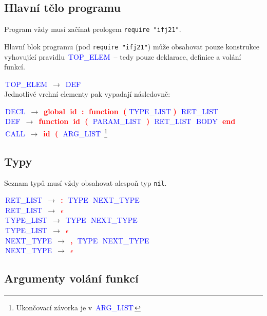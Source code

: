\documentclass[a4paper]{article}
\theoremstyle{definition}
\newcommand{\nter}[1]{\textcolor{blue}{\,#1\,}}
\newcommand{\ter}[1]{\textbf{\textcolor{red}{\,#1\,}}}
\newcommand{\grule}[2]{{\small\nter{#1} $\to$ #2}\\}
\begin{document}
	\begin{multicols}{2}

	\subsection{Hlavní tělo programu}

	Program vždy musí začínat prologem \texttt{require "ifj21"}.


		Hlavní blok programu (pod \texttt{require "ifj21"}) může obsahovat pouze konstrukce vyhovující pravidlu \nter{TOP\_ELEM} -- tedy pouze deklarace, definice a volání funkcí.


	\grule{TOP\_ELEM}{\nter{DEF}}

	Jednotlivé vrchní elementy pak vypadají následovně:

	\grule{DECL}{\ter{global} \ter{id} \ter{:} \ter{function} \ter{(}\nter{TYPE\_LIST}\ter{)} \nter{RET\_LIST}}
	\grule{DEF}{\ter{function} \ter{id} \ter{(} \nter{PARAM\_LIST} \ter{)} \nter{RET\_LIST} \nter{BODY} \ter{end}}
	\grule{CALL}{\ter{id} \ter{(} \nter{ARG\_LIST} \footnote{Ukončovací závorka je v \nter{ARG\_LIST}}} %


	\subsection{Typy}

	Seznam typů musí vždy obsahovat alespoň typ \texttt{nil}.

	\grule{RET\_LIST}{\ter{:} \nter{TYPE} \nter{NEXT\_TYPE}}
	\grule{RET\_LIST}{\ter{$\epsilon$}}

	\grule{TYPE\_LIST}{\nter{TYPE} \nter{NEXT\_TYPE}}
	\grule{TYPE\_LIST}{\ter{$\epsilon$}}
	\grule{NEXT\_TYPE}{\ter{,} \nter{TYPE} \nter{NEXT\_TYPE}}
	\grule{NEXT\_TYPE}{\ter{$\epsilon$}}

	\subsection{Argumenty volání funkcí}


\end{multicols}
\end{document}

